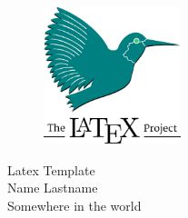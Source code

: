 \documentclass[14pt,a4paper]{extarticle}
\begin{document}
\begin{titlepage}
  \begin{figure}
    \centering
    \includegraphics[width=4cm]{latex.png}
  \end{figure}
  \begin{center}
    \Huge Latex Template \\
    \vspace{5cm} 
    \LARGE Name Lastname \\
    \vfill
    \LARGE Somewhere in the world
    \pagebreak
  \end{center}
\end{titlepage}


\end{document}
